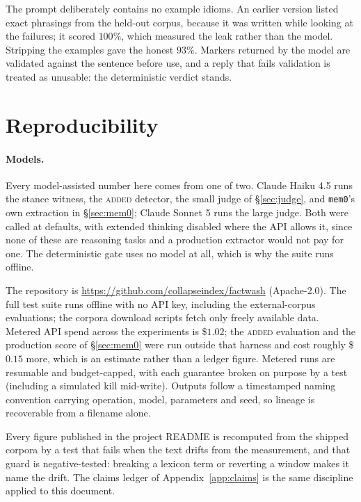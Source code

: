 \documentclass[11pt]{article}
\begin{document}
The prompt deliberately contains no example idioms. An earlier version listed exact
phrasings from the held-out corpus, because it was written while looking at the
failures; it scored $100\%$, which measured the leak rather than the model. Stripping
the examples gave the honest $93\%$. Markers returned by the model are validated against
the sentence before use, and a reply that fails validation is treated as unusable: the
deterministic verdict stands.

\section{Reproducibility}
\label{app:repro}

\paragraph{Models.} Every model-assisted number here comes from one of two. Claude Haiku
4.5 \citep{anthropic2025haiku} runs the stance witness, the \textsc{added} detector, the
small judge of \S\ref{sec:judge}, and \texttt{mem0}'s own extraction in
\S\ref{sec:mem0}; Claude Sonnet 5 \citep{anthropic2025sonnet} runs the large judge. Both
were called at defaults, with extended thinking disabled where the API allows it, since
none of these are reasoning tasks and a production extractor would not pay for one. The
deterministic gate uses no model at all, which is why the suite runs offline.

The repository is \url{https://github.com/collapseindex/factwash} (Apache-2.0). The full
test suite runs offline with no API key, including the external-corpus evaluations; the
corpora download scripts fetch only freely available data. Metered API spend across the
experiments is \$$1.02$; the \textsc{added} evaluation and the production score of
\S\ref{sec:mem0} were run outside that harness and cost roughly \$$0.15$ more, which is
an estimate rather than a ledger figure. Metered runs are resumable and budget-capped,
with each guarantee broken on purpose by a test (including a simulated kill mid-write). Outputs follow a timestamped naming convention carrying operation,
model, parameters and seed, so lineage is recoverable from a filename alone.

Every figure published in the project README is recomputed from the shipped corpora by a
test that fails when the text drifts from the measurement, and that guard is
negative-tested: breaking a lexicon term or reverting a window makes it name the drift.
The claims ledger of Appendix~\ref{app:claims} is the same discipline applied to this
document.
\end{document}
